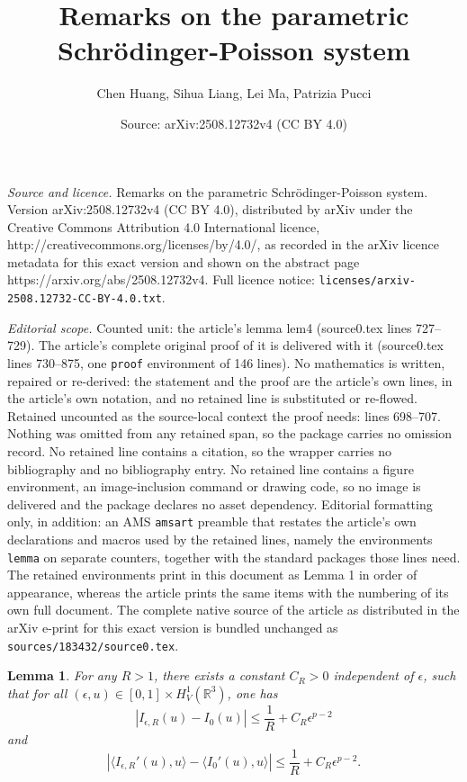 \documentclass[10pt,a4paper]{amsart}
\title{Remarks on the parametric Schr\"{o}dinger-Poisson system}
\author{Chen Huang, Sihua Liang, Lei Ma, Patrizia Pucci}
\date{Source: arXiv:2508.12732v4 (CC BY 4.0)}
\newtheorem{lemma}{Lemma}
\begin{document}
\maketitle

\noindent\emph{Source and licence.} Remarks on the parametric Schr\"{o}dinger-Poisson system. Version arXiv:2508.12732v4 (CC BY 4.0), distributed by arXiv under the Creative Commons Attribution 4.0 International licence, http://creativecommons.org/licenses/by/4.0/, as recorded in the arXiv licence metadata for this exact version and shown on the abstract page https://arxiv.org/abs/2508.12732v4. Full licence notice: \texttt{licenses/arxiv-2508.12732-CC-BY-4.0.txt}.\par\smallskip

\noindent\textit{Editorial scope.} Counted unit: the article's lemma lem4 (source0.tex lines 727--729). The article's complete original proof of it is delivered with it (source0.tex lines 730--875, one \texttt{proof} environment of 146 lines). No mathematics is written, repaired or re-derived: the statement and the proof are the article's own lines, in the article's own notation, and no retained line is substituted or re-flowed.  Retained uncounted as the source-local context the proof needs: lines 698--707.  Nothing was omitted from any retained span, so the package carries no omission record.  No retained line contains a citation, so the wrapper carries no bibliography and no bibliography entry.  No retained line contains a figure environment, an image-inclusion command or drawing code, so no image is delivered and the package declares no asset dependency.  Editorial formatting only, in addition: an AMS \texttt{amsart} preamble that restates the article's own declarations and macros used by the retained lines, namely the environments \texttt{lemma} on separate counters, together with the standard packages those lines need.  The retained environments print in this document as Lemma 1 in order of appearance, whereas the article prints the same items with the numbering of its own full document.  The complete native source of the article as distributed in the arXiv e-print for this exact version is bundled unchanged as \texttt{sources/183432/source0.tex}.
\begin{lemma}\label{lem3.5}
       For any $R> 1$, there exists a constant $C_{R} > 0$ independent of $\epsilon $, such that for all $\left ( \epsilon ,u \right )\in \left [ 0,1 \right ]\times H_{V}^{1}\left (  \mathbb{R}^{3}\right )$, one has
      \begin{equation*}
      \left | I_{\epsilon,R }\left ( u \right )-I_{0}\left ( u \right )\right |\leq \frac{1}{R}+C_{R}\epsilon ^{p-2}
      \end{equation*}
      and
      \begin{equation*}
      \left | \langle I_{\epsilon,R }'\left ( u \right ),u\rangle-\langle I_{0}'\left ( u \right ),u\rangle\right |\leq \frac{1}{R}+C_{R}\epsilon ^{p-2}.
        \end{equation*}
\end{lemma}
\end{document}
